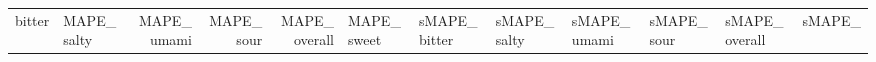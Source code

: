\begin{tabular}{llrrr}
bitter & MAPE_%
salty & MAPE_%
umami & MAPE_%
sour & MAPE_%
overall & MAPE_%
sweet & sMAPE_%
bitter & sMAPE_%
salty & sMAPE_%
umami & sMAPE_%
sour & sMAPE_%
overall & sMAPE_%
\bottomrule
\end{tabular}

